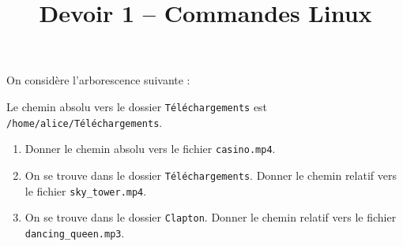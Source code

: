 \documentclass[a4paper,dvipsnames]{article}
\title{Devoir 1 -- Commandes Linux}
\author{}
\date{}
\begin{document}
\renewcommand{\contentsname}{}

\pagestyle{fancy}

\begin{tcolorbox}[colframe=blue!75, colback=blue!45, valign=center, height=1.5cm, top=5mm]
  \maketitle
\end{tcolorbox}


\vspace{1cm}

\thispagestyle{fancy}

\begin{exercice}{}{}
  On considère l'arborescence suivante :

  \bigskip


  \bigskip

  Le chemin absolu vers le dossier \texttt{Téléchargements} est \texttt{/home/alice/Téléchargements}.

  \begin{enumerate}
    \item Donner le chemin absolu vers le fichier \texttt{casino.mp4}.
    \item On se trouve dans le dossier \texttt{Téléchargements}. Donner le chemin relatif vers le fichier \texttt{sky_tower.mp4}.
    \item On se trouve dans le dossier \texttt{Clapton}. Donner le chemin relatif vers le fichier \texttt{dancing_queen.mp3}.
  \end{enumerate}
\end{exercice}

\smallskip
\end{document}
